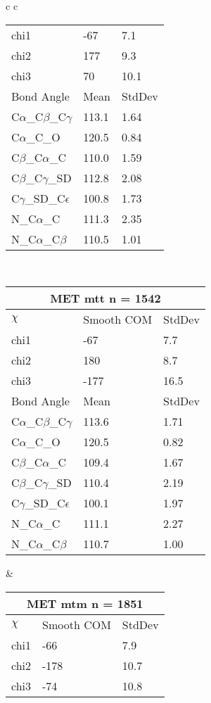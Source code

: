 \begin{longtable}{ c c }
\begin{tabular}{ l l l }
  chi1 & -67 & 7.1 \\ 
  chi2 & 177 & 9.3 \\ 
  chi3 & 70 & 10.1 \\ \midrule
  Bond Angle   & Mean     & StdDev \\ \midrule
  C$\alpha$\_C$\beta$\_C$\gamma$ & 113.1 & 1.64\\
  C$\alpha$\_C\_O & 120.5 & 0.84\\
  C$\beta$\_C$\alpha$\_C & 110.0 & 1.59\\
  C$\beta$\_C$\gamma$\_SD & 112.8 & 2.08\\
  C$\gamma$\_SD\_C$\epsilon$ & 100.8 & 1.73\\
  N\_C$\alpha$\_C & 111.3 & 2.35\\
  N\_C$\alpha$\_C$\beta$ & 110.5 & 1.01\\
  \bottomrule
  \end{tabular}
  \\
  \begin{tabular}{ l l l }
  \toprule
  \multicolumn{3}{c}{MET \textbf{mtt} n = 1542} \\ \toprule
  $\chi$       & Smooth COM & StdDev \\ \midrule
  chi1 & -67 & 7.7 \\ 
  chi2 & 180 & 8.7 \\ 
  chi3 & -177 & 16.5 \\ \midrule
  Bond Angle   & Mean     & StdDev \\ \midrule
  C$\alpha$\_C$\beta$\_C$\gamma$ & 113.6 & 1.71\\
  C$\alpha$\_C\_O & 120.5 & 0.82\\
  C$\beta$\_C$\alpha$\_C & 109.4 & 1.67\\
  C$\beta$\_C$\gamma$\_SD & 110.4 & 2.19\\
  C$\gamma$\_SD\_C$\epsilon$ & 100.1 & 1.97\\
  N\_C$\alpha$\_C & 111.1 & 2.27\\
  N\_C$\alpha$\_C$\beta$ & 110.7 & 1.00\\
  \bottomrule
  \end{tabular}
  &
  \begin{tabular}{ l l l }
  \toprule
  \multicolumn{3}{c}{MET \textbf{mtm} n = 1851} \\ \toprule
  $\chi$       & Smooth COM & StdDev \\ \midrule
  chi1 & -66 & 7.9 \\ 
  chi2 & -178 & 10.7 \\ 
  chi3 & -74 & 10.8 \\ \midrule

\end{tabular}
\end{longtable}
